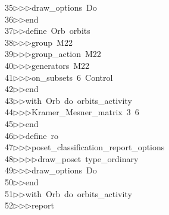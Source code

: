 \begin{tabbing}
35\>$\triangleright$\>$\triangleright$\>$\triangleright$\>draw\_options\ Do\ \\[0pt]
36\>$\triangleright$\>$\triangleright$\>end\ \\[0pt]
37\>$\triangleright$\>$\triangleright$\>define\ Orb\ orbits\ \\[0pt]
38\>$\triangleright$\>$\triangleright$\>$\triangleright$\>group\ M22\ \\[0pt]
39\>$\triangleright$\>$\triangleright$\>$\triangleright$\>group\_action\ M22\ \\[0pt]
40\>$\triangleright$\>$\triangleright$\>$\triangleright$\>generators\ M22\ \\[0pt]
41\>$\triangleright$\>$\triangleright$\>$\triangleright$\>on\_subsets\ 6\ Control\ \\[0pt]
42\>$\triangleright$\>$\triangleright$\>end\ \\[0pt]
43\>$\triangleright$\>$\triangleright$\>with\ Orb\ do\ orbits\_activity\ \\[0pt]
44\>$\triangleright$\>$\triangleright$\>$\triangleright$\>Kramer\_Mesner\_matrix\ 3\ 6\ \\[0pt]
45\>$\triangleright$\>$\triangleright$\>end\ \\[0pt]
46\>$\triangleright$\>$\triangleright$\>define\ ro\ \\[0pt]
47\>$\triangleright$\>$\triangleright$\>$\triangleright$\>poset\_classification\_report\_options\ \\[0pt]
48\>$\triangleright$\>$\triangleright$\>$\triangleright$\>$\triangleright$\>draw\_poset\ type\_ordinary\ \\[0pt]
49\>$\triangleright$\>$\triangleright$\>$\triangleright$\>draw\_options\ Do\ \\[0pt]
50\>$\triangleright$\>$\triangleright$\>end\ \\[0pt]
51\>$\triangleright$\>$\triangleright$\>with\ Orb\ do\ orbits\_activity\ \\[0pt]
52\>$\triangleright$\>$\triangleright$\>$\triangleright$\>report\ \ \\[0pt]

\end{tabbing}
